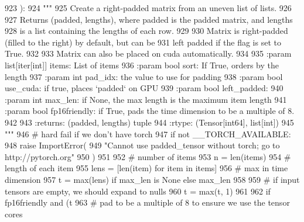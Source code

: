 \begin{DoxyCode}
923 ):
924     \textcolor{stringliteral}{"""}
925 \textcolor{stringliteral}{    Create a right-padded matrix from an uneven list of lists.}
926 \textcolor{stringliteral}{}
927 \textcolor{stringliteral}{    Returns (padded, lengths), where padded is the padded matrix, and lengths}
928 \textcolor{stringliteral}{    is a list containing the lengths of each row.}
929 \textcolor{stringliteral}{}
930 \textcolor{stringliteral}{    Matrix is right-padded (filled to the right) by default, but can be}
931 \textcolor{stringliteral}{    left padded if the flag is set to True.}
932 \textcolor{stringliteral}{}
933 \textcolor{stringliteral}{    Matrix can also be placed on cuda automatically.}
934 \textcolor{stringliteral}{}
935 \textcolor{stringliteral}{    :param list[iter[int]] items: List of items}
936 \textcolor{stringliteral}{    :param bool sort: If True, orders by the length}
937 \textcolor{stringliteral}{    :param int pad\_idx: the value to use for padding}
938 \textcolor{stringliteral}{    :param bool use\_cuda: if true, places `padded` on GPU}
939 \textcolor{stringliteral}{    :param bool left\_padded:}
940 \textcolor{stringliteral}{    :param int max\_len: if None, the max length is the maximum item length}
941 \textcolor{stringliteral}{    :param bool fp16friendly: if True, pads the time dimension to be a multiple of 8.}
942 \textcolor{stringliteral}{}
943 \textcolor{stringliteral}{    :returns: (padded, lengths) tuple}
944 \textcolor{stringliteral}{    :rtype: (Tensor[int64], list[int])}
945 \textcolor{stringliteral}{    """}
946     \textcolor{comment}{# hard fail if we don't have torch}
947     \textcolor{keywordflow}{if} \textcolor{keywordflow}{not} \_\_TORCH\_AVAILABLE:
948         \textcolor{keywordflow}{raise} ImportError(
949             \textcolor{stringliteral}{"Cannot use padded\_tensor without torch; go to http://pytorch.org"}
950         )
951 
952     \textcolor{comment}{# number of items}
953     n = len(items)
954     \textcolor{comment}{# length of each item}
955     lens = [len(item) \textcolor{keywordflow}{for} item \textcolor{keywordflow}{in} items]
956     \textcolor{comment}{# max in time dimension}
957     t = max(lens) \textcolor{keywordflow}{if} max\_len \textcolor{keywordflow}{is} \textcolor{keywordtype}{None} \textcolor{keywordflow}{else} max\_len
958 
959     \textcolor{comment}{# if input tensors are empty, we should expand to nulls}
960     t = max(t, 1)
961 
962     \textcolor{keywordflow}{if} fp16friendly \textcolor{keywordflow}{and} (t %
963         \textcolor{comment}{# pad to be a multiple of 8 to ensure we use the tensor cores}

\end{DoxyCode}
